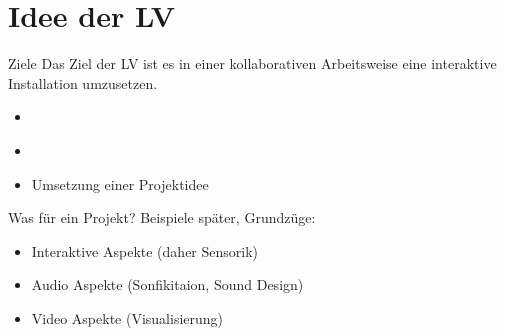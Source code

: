 \section{Idee der LV}
 \frame{\sectionpage}

\begin{frame}{Ziele}
Das Ziel der LV ist es in einer kollaborativen Arbeitsweise eine interaktive Installation umzusetzen.

\begin{itemize}
    \item \textcolor{white}{Aneignung von Theorie und Praxis}
    \item \textcolor{white}{Koordination von Expertise}
    \item \textcolor{red2}{Umsetzung einer Projektidee}
\end{itemize}
    
\end{frame}

\begin{frame}{Was für ein Projekt?}
Beispiele später, Grundzüge:

\begin{itemize}
    \item Interaktive Aspekte (daher Sensorik)
    \item Audio Aspekte (Sonfikitaion, Sound Design)
    \item Video Aspekte (Visualisierung)
\end{itemize}

\end{frame}






    



    
